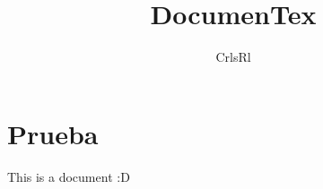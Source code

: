 \documentclass[12pt,letterpaper]{article}
\title{DocumenTex}
\author{CrlsRl}
\begin{document}
\maketitle
\section{Prueba}
This is a document :D
\end{document}
